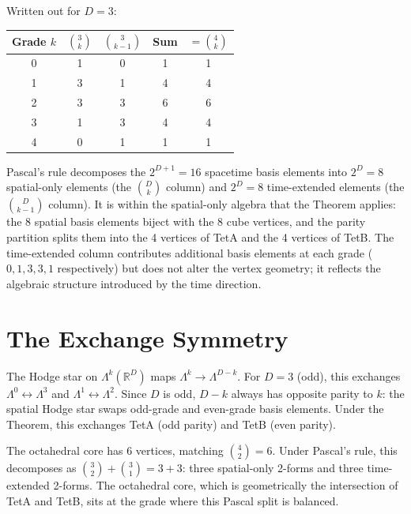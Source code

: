 \documentclass[twocolumn]{iopjournal}
\begin{document}
Written out for $D = 3$:

\vspace{6pt}
\noindent
\begin{tabular*}{\columnwidth}{@{\extracolsep{\fill}}ccccc@{}}
\hline
Grade $k$ & $\binom{3}{k}$ & $\binom{3}{k\!-\!1}$ & Sum & $= \binom{4}{k}$ \\
\hline
0 & 1 & 0 & 1 & 1 \\
1 & 3 & 1 & 4 & 4 \\
2 & 3 & 3 & 6 & 6 \\
3 & 1 & 3 & 4 & 4 \\
4 & 0 & 1 & 1 & 1 \\
\hline
\end{tabular*}
\vspace{6pt}

Pascal's rule decomposes the $2^{D+1} = 16$ spacetime basis elements into $2^D = 8$ spatial-only elements (the $\binom{D}{k}$ column) and $2^D = 8$ time-extended elements (the $\binom{D}{k-1}$ column). It is within the spatial-only algebra that the Theorem applies: the 8 spatial basis elements biject with the 8 cube vertices, and the parity partition splits them into the 4 vertices of TetA and the 4 vertices of TetB. The time-extended column contributes additional basis elements at each grade ($0, 1, 3, 3, 1$ respectively) but does not alter the vertex geometry; it reflects the algebraic structure introduced by the time direction.


\section*{The Exchange Symmetry}

The Hodge star on $\Lambda^k(\mathbb{R}^D)$ maps $\Lambda^k \to \Lambda^{D-k}$. For $D = 3$ (odd), this exchanges $\Lambda^0 \leftrightarrow \Lambda^3$ and $\Lambda^1 \leftrightarrow \Lambda^2$. Since $D$ is odd, $D - k$ always has opposite parity to $k$: the spatial Hodge star swaps odd-grade and even-grade basis elements. Under the Theorem, this exchanges TetA (odd parity) and TetB (even parity).

The octahedral core has 6 vertices, matching $\binom{4}{2} = 6$. Under Pascal's rule, this decomposes as $\binom{3}{2} + \binom{3}{1} = 3 + 3$: three spatial-only 2-forms and three time-extended 2-forms. The octahedral core, which is geometrically the intersection of TetA and TetB, sits at the grade where this Pascal split is balanced.
\end{document}
